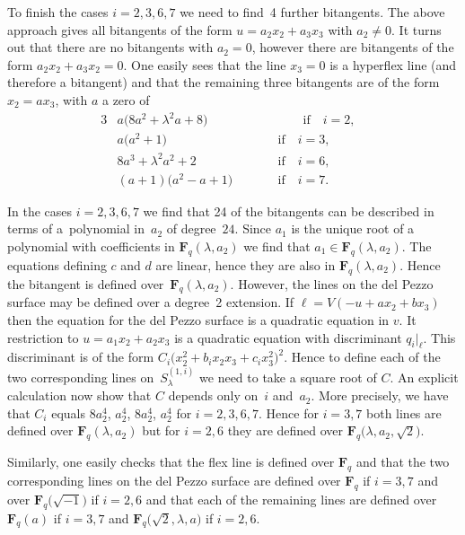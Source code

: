 \documentclass[pdftex]{sigma}
\numberwithin{equation}{section}
\begin{document}
To f\/inish the cases $i=2,3,6,7$ we need to f\/ind~4 further bitangents. The above approach gives all bitangents of the form $u=a_2x_2+a_3x_3$ with $a_2\neq 0$. It turns out that there are no bitangents with $a_2=0$, however there are bitangents of the form $a_2x_2+a_3x_2=0$. One easily sees that the line $x_3=0$ is a hyperf\/lex line (and therefore a bitangent) and that the remaining three bitangents are of the form $x_2=ax_3$, with $a$ a zero of
\begin{alignat*}{3} & a\big(8a^2+\lambda^2 a +8\big) &&\qquad \text{if} \quad i=2,&\\
& a\big(a^2+1\big) \qquad &&\text{if} \quad i=3,&\\
 &8a^3+ \lambda^2 a^2+2 \qquad &&\text{if} \quad i=6,&\\
& (a+1)\big(a^2-a+1\big) \qquad &&\text{if}\quad i=7. &\end{alignat*}

In the cases $i=2,3,6,7$ we f\/ind that 24 of the bitangents can be described in terms of a~polynomial in~$a_2$ of degree~$24$. Since $a_1$ is the unique root of a polynomial with coef\/f\/icients in $\mathbf{F}_q(\lambda,a_2)$ we f\/ind that $a_1\in \mathbf{F}_q(\lambda,a_2)$. The equations def\/ining $c$ and $d$ are linear, hence they are also in $\mathbf{F}_q(\lambda, a_2)$. Hence the bitangent is def\/ined over~$\mathbf{F}_q(\lambda,a_2)$. However, the lines on the del Pezzo surface may be def\/ined over a degree~2 extension. If $\ell=V(-u+ax_2+bx_3)$ then the equation for the del Pezzo surface is a quadratic equation in $v$. It restriction to $u=a_1x_2+a_2x_3$ is a quadratic equation with discriminant $q_i|_{\ell}$. This discriminant is of the form $C_i\big(x_2^2+b_ix_2x_3+c_ix_3^2\big)^2$. Hence to def\/ine each of the two corresponding lines on~$S^{(1,i)}_\lambda$ we need to take a square root of $C$. An explicit calculation now show that $C$ depends only on~$i$ and~$a_2$. More precisely, we have that $C_i$ equals $8a_2^4$, $a_2^4$, $8a_2^4$, $a_2^4$ for $i=2,3,6,7$. Hence for $i=3,7$ both lines are def\/ined over $\mathbf{F}_q(\lambda,a_2)$ but for $i=2,6$ they are def\/ined over $\mathbf{F}_q\big(\lambda,a_2,\sqrt{2}\big)$.

Similarly, one easily checks that the f\/lex line is def\/ined over $\mathbf{F}_q$ and that the two corresponding lines on the del Pezzo surface are def\/ined over $\mathbf{F}_q$ if $i=3,7$ and over $\mathbf{F}_q\big(\sqrt{-1}\big)$ if $i=2,6$ and that each of the remaining lines are def\/ined over $\mathbf{F}_q(a)$ if $i=3,7$ and $\mathbf{F}_q\big(\sqrt{2},\lambda,a\big)$ if $i=2,6$.
\end{document}
